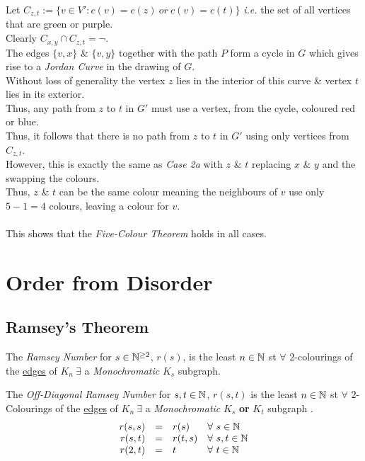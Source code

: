 \documentclass[11pt,a4paper]{article}
\begin{document}
Let $C_{z,t}:=\{v\in V':c(v)=c(z)\ or\ c(v)=c(t)\}$ \textit{i.e.} the set of all vertices that are green or purple.\\
Clearly $C_{x,y}\cap C_{z,t}=\neg$.\\
The edges $\{v,x\}$ \& $\{v,y\}$ together with the path $P$ form a cycle in $G$ which gives rise to a \textit{Jordan Curve} in the drawing of $G$.\\
Without loss of generality the vertex $z$ lies in the interior of this curve \& vertex $t$ lies in its exterior.\\
Thus, any path from $z$ to $t$ in $G'$ must use a vertex, from the cycle, coloured red or blue.\\
Thus, it follows that there is no path from $z$ to $t$ in $G'$ using only vertices from $C_{z,t}$.\\
However, this is exactly the same as \textit{Case 2a} with $z$ \& $t$ replacing $x$ \& $y$ and the swapping the colours.\\
Thus, $z$ \& $t$ can be the same colour meaning the neighbours of $v$ use only $5-1=4$ colours, leaving a colour for $v$.\\
\\
This shows that the \textit{Five-Colour Theorem} holds in all cases.

\section{Order from Disorder}

\subsection{Ramsey's Theorem}

The \textit{Ramsey Number} for $s\in\mathbb{N}^{\geq2}$, $r(s)$, is the least $n\in\mathbb{N}$ st $\forall$ $2$-colourings of the \underline{edges} of $K_n\ \exists$ a \textit{Monochromatic} $K_s$ subgraph.\\


The \textit{Off-Diagonal Ramsey Number} for $s,t\in\mathbb{N}$, $r(s,t)$ is the least $n\in\mathbb{N}$ st $\forall$ $2$-Colourings of the \underline{edges} of $K_n\ \exists$ a \textit{Monochromatic} $K_s$ \textbf{or} $K_t$ subgraph .\\

\[\begin{array}{rcll}
r(s,s)&=&r(s)&\forall\ s\in\mathbb{N}\\
r(s,t)&=&r(t,s)&\forall\ s,t\in\mathbb{N}\\
r(2,t)&=&t&\forall\ t\in\mathbb{N}
\end{array}\]
\end{document}
